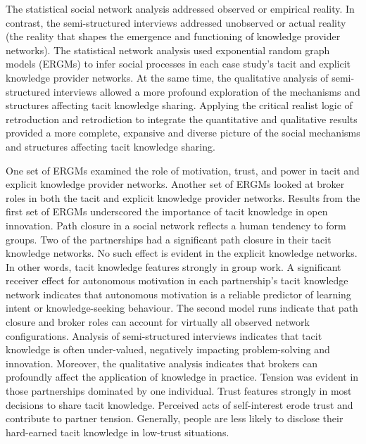 \documentclass[12pt,table]{book}
\begin{document}
The statistical social network analysis addressed observed or empirical reality. In contrast, the semi-structured interviews addressed unobserved or actual reality (the reality that shapes the emergence and functioning of knowledge provider networks). The statistical network analysis used exponential random graph models (ERGMs) to infer social processes in each case study's tacit and explicit knowledge provider networks. At the same time, the qualitative analysis of semi-structured interviews allowed a more profound exploration of the mechanisms and structures affecting tacit knowledge sharing. Applying the critical realist logic of retroduction and retrodiction to integrate the quantitative and qualitative results provided a more complete, expansive and diverse picture of the social mechanisms and structures affecting tacit knowledge sharing. \medskip

One set of ERGMs examined the role of motivation, trust, and power in tacit and explicit knowledge provider networks. Another set of ERGMs looked at broker roles in both the tacit and explicit knowledge provider networks. Results from the first set of ERGMs underscored the importance of tacit knowledge in open innovation. Path closure in a social network reflects a human tendency to form groups. Two of the partnerships had a significant path closure in their tacit knowledge networks. No such effect is evident in the explicit knowledge networks. In other words, tacit knowledge features strongly in group work. A significant receiver effect for autonomous motivation in each partnership's tacit knowledge network indicates that autonomous motivation is a reliable predictor of learning intent or knowledge-seeking behaviour. The second model runs indicate that path closure and broker roles can account for virtually all observed network configurations. Analysis of semi-structured interviews indicates that tacit knowledge is often under-valued, negatively impacting problem-solving and innovation. Moreover, the qualitative analysis indicates that brokers can profoundly affect the application of knowledge in practice. Tension was evident in those partnerships dominated by one individual. Trust features strongly in most decisions to share tacit knowledge. Perceived acts of self-interest erode trust and contribute to partner tension. Generally, people are less likely to disclose their hard-earned tacit knowledge in low-trust situations. \medskip
\end{document}

